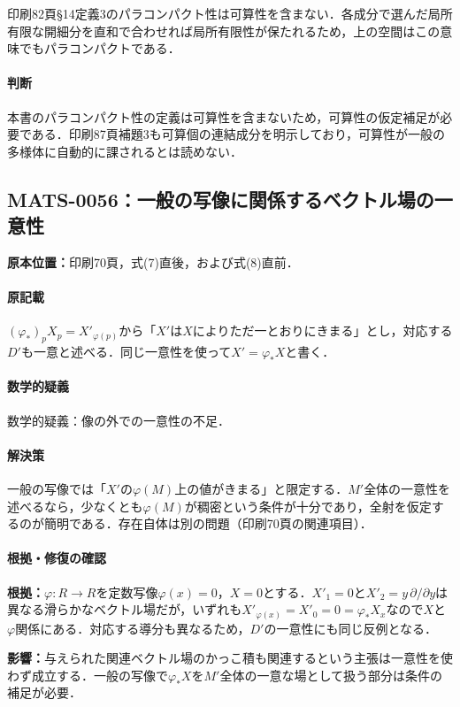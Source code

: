 \documentclass[a4paper,10pt]{ltjsarticle}
\begin{document}
印刷82頁\S14定義3のパラコンパクト性は可算性を含まない．各成分で選んだ局所有限な開細分を直和で合わせれば局所有限性が保たれるため，上の空間はこの意味でもパラコンパクトである．

\paragraph{判断}本書のパラコンパクト性の定義は可算性を含まないため，可算性の仮定補足が必要である．印刷87頁補題3も可算個の連結成分を明示しており，可算性が一般の多様体に自動的に課されるとは読めない．


\subsection*{MATS-0056：一般の写像に関係するベクトル場の一意性}\label{math:MATS-0056}
\noindent\textbf{原本位置：}印刷70頁，式(7)直後，および式(8)直前．

\paragraph{原記載}$(\varphi_*)_pX_p=X'_{\varphi(p)}$から「$X'$は$X$によりただ一とおりにきまる」とし，対応する$D'$も一意と述べる．同じ一意性を使って$X'=\varphi_*X$と書く．

\paragraph{数学的疑義}数学的疑義：像の外での一意性の不足．

\paragraph{解決策}一般の写像では「$X'$の$\varphi(M)$上の値がきまる」と限定する．$M'$全体の一意性を述べるなら，少なくとも$\varphi(M)$が稠密という条件が十分であり，全射を仮定するのが簡明である．存在自体は別の問題（印刷70頁の関連項目）．

\paragraph{根拠・修復の確認}\textbf{根拠：}$\varphi:R\to R$を定数写像$\varphi(x)=0$，$X=0$とする．$X'_1=0$と$X'_2=y\,\partial/\partial y$は異なる滑らかなベクトル場だが，いずれも$X'_{\varphi(x)}=X'_0=0=\varphi_*X_x$なので$X$と$\varphi$関係にある．対応する導分も異なるため，$D'$の一意性にも同じ反例となる．

\textbf{影響：}与えられた関連ベクトル場のかっこ積も関連するという主張は一意性を使わず成立する．一般の写像で$\varphi_*X$を$M'$全体の一意な場として扱う部分は条件の補足が必要．
\end{document}
